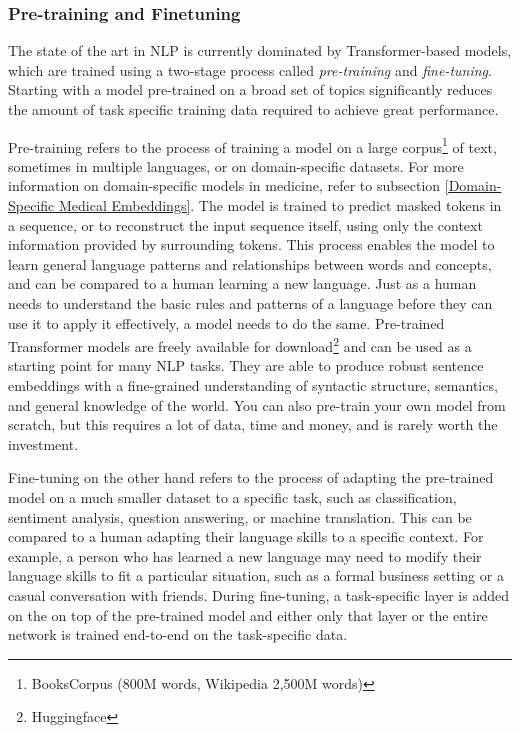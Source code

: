 \subsubsection*{Pre-training and Finetuning}
The state of the art in NLP is currently dominated by Transformer-based models, which are trained using a two-stage process called \textit{pre-training} and \textit{fine-tuning}. Starting with a model pre-trained on a broad set of topics significantly reduces the amount of task specific training data required to achieve great performance.

Pre-training refers to the process of training a model on a large corpus\footnote{BooksCorpus (800M words, Wikipedia 2,500M words)}\cite{https://doi.org/10.48550/arxiv.1810.04805} of text, sometimes in multiple languages, or on domain-specific datasets.
For more information on domain-specific models in medicine, refer to subsection \ref{Domain-Specific Medical Embeddings}.
The model is trained to predict masked tokens in a sequence, or to reconstruct the input sequence itself, using only the context information provided by surrounding tokens.
This process enables the model to learn general language patterns and relationships between words and concepts, and can be compared to a human learning a new language.
Just as a human needs to understand the basic rules and patterns of a language before they can use it to apply it effectively, a model needs to do the same.
Pre-trained Transformer models are freely available for download\footnote{Huggingface} and can be used as a starting point for many NLP tasks.
They are able to produce robust sentence embeddings with a fine-grained understanding of syntactic structure, semantics, and general knowledge of the world.
You can also pre-train your own model from scratch, but this requires a lot of data, time and money, and is rarely worth the investment.

Fine-tuning on the other hand refers to the process of adapting the pre-trained model on a much smaller dataset to a specific task, such as classification, sentiment analysis, question answering, or machine translation.
This can be compared to a human adapting their language skills to a specific context.
For example, a person who has learned a new language may need to modify their language skills to fit a particular situation, such as a formal business setting or a casual conversation with friends.
During fine-tuning, a task-specific layer is added on the on top of the pre-trained model and either only that layer or the entire network is trained end-to-end on the task-specific data.

